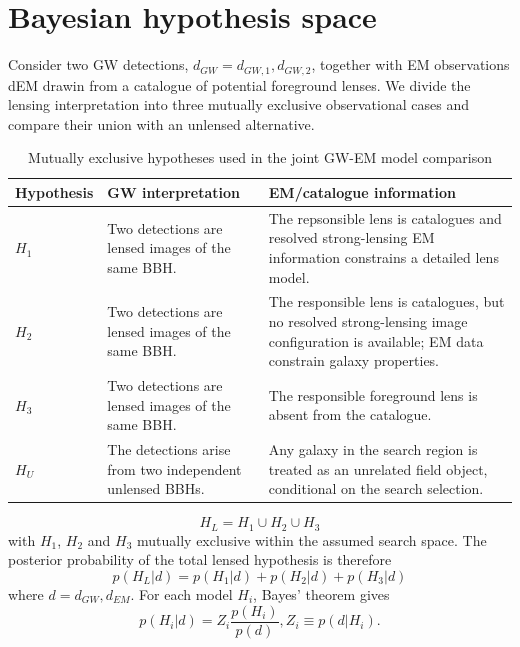 \documentclass[pdflatex,sn-mathphys-num]{sn-jnl}%
\theoremstyle{thmstyleone}%
\theoremstyle{thmstyletwo}%
\theoremstyle{thmstylethree}%
\begin{document}
\section{Bayesian hypothesis space}
Consider two GW detections, $d_{GW}={d_{GW,1},d_{GW,2}}$, together with EM observations dEM drawin from a catalogue of potential foreground lenses. 
We divide the lensing interpretation into three mutually exclusive observational cases and compare their union with an unlensed alternative.
\begin{table}[h]
\centering
\caption{Mutually exclusive hypotheses used in the joint GW-EM model comparison}
\label{}
\begin{tabular}{|p{2cm}|p{3cm}|p{4cm}|}
\hline
Hypothesis & GW interpretation & EM/catalogue information \\ \hline
$H_1$       & Two detections are lensed images of the same BBH.        & The repsonsible lens is catalogues and resolved strong-lensing EM information constrains a detailed lens model.         \\ \hline
$H_2$       & Two detections are lensed images of the same BBH.        & The responsible lens is catalogues, but no resolved strong-lensing image configuration is available; EM data constrain galaxy properties.        \\ \hline
$H_3$       & Two detections are lensed images of the same BBH.        & The responsible foreground lens is absent from the catalogue.              \\ \hline
$H_U$       & The detections arise from two independent unlensed BBHs.         & Any galaxy in the search region is treated as an unrelated field object, conditional on the search selection.              \\ \hline  
\end{tabular}
\end{table}
\begin{equation}
H_L = H_1 \cup H_2 \cup H_3
\end{equation}
with $H_1$, $H_2$ and $H_3$ mutually exclusive within the assumed search space. 
The posterior probability of the total lensed hypothesis is therefore
\begin{equation}
p(H_L|d) = p(H_1|d) + p(H_2|d) + p(H_3|d)
\end{equation}
where $d={d_{GW},d_{EM}}$. For each model $H_i$, Bayes' theorem gives
\begin{equation}
p(H_i|d) = Z_i \frac{p(H_i)}{p(d)}, Z_i \equiv p(d|H_i).
\end{equation}
\end{document}
